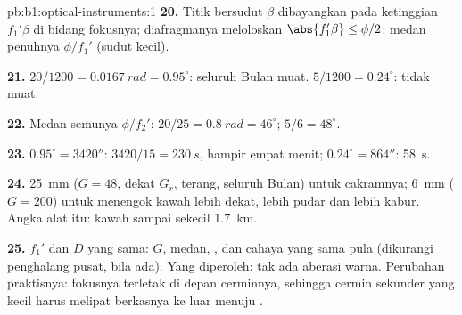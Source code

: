 \begin{solution}{pb:b1:optical-instruments:1}
\textbf{20.} Titik bersudut $\beta$ dibayangkan pada ketinggian $f_1'\beta$
di bidang fokusnya; diafragmanya meloloskan $\abs{f_1'\beta} \leq \phi/2$:
medan penuhnya $\phi/f_1'$ (sudut kecil).

\textbf{21.} $20/1200 = \qty{0.0167}{rad} = 0.95^\circ$: seluruh Bulan
muat. $5/1200 = 0.24^\circ$: tidak muat.

\textbf{22.} Medan semunya $\phi/f_2'$: $20/25 = \qty{0.8}{rad} = 46^\circ$;
$5/6 = 48^\circ$.

\textbf{23.} $0.95^\circ = 3420''$: $3420/15 = \qty{230}{s}$, hampir
empat menit; $0.24^\circ = 864''$: \qty{58}{s}.

\textbf{24.}  \qty{25}{mm} ($G = 48$, dekat $G_r$, terang, seluruh
Bulan) untuk cakramnya;  \qty{6}{mm} ($G = 200$) untuk menengok
kawah lebih dekat, lebih pudar dan lebih kabur. Angka alat itu: kawah
sampai sekecil \qty{1.7}{km}.

\textbf{25.} $f_1'$ dan $D$ yang sama: $G$, medan, ,  dan cahaya yang sama pula (dikurangi penghalang pusat, bila ada).
Yang diperoleh: tak ada aberasi warna. Perubahan praktisnya: fokusnya
terletak di depan cerminnya, sehingga cermin sekunder yang kecil harus
melipat berkasnya ke luar menuju .
\end{solution}
